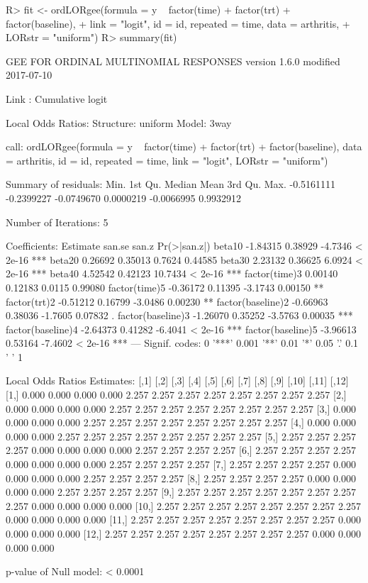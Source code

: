 \documentclass[
]{jss}
\begin{document}
\begin{CodeChunk}
\begin{CodeInput}
R>  fit <- ordLORgee(formula = y ~ factor(time) + factor(trt) + factor(baseline),
+         link = "logit", id = id, repeated = time, data = arthritis,
+         LORstr = "uniform")
R>  summary(fit)
\end{CodeInput}
\begin{CodeOutput}
GEE FOR ORDINAL MULTINOMIAL RESPONSES 
version 1.6.0 modified 2017-07-10 

Link : Cumulative logit 

Local Odds Ratios:
Structure:         uniform
Model:             3way

call:
ordLORgee(formula = y ~ factor(time) + factor(trt) + factor(baseline), 
    data = arthritis, id = id, repeated = time, link = "logit", 
    LORstr = "uniform")

Summary of residuals:
      Min.    1st Qu.     Median       Mean    3rd Qu.       Max. 
-0.5161111 -0.2399227 -0.0749670  0.0000219 -0.0066995  0.9932912 

Number of Iterations: 5 

Coefficients:
                  Estimate   san.se   san.z Pr(>|san.z|)    
beta10            -1.84315  0.38929 -4.7346      < 2e-16 ***
beta20             0.26692  0.35013  0.7624      0.44585    
beta30             2.23132  0.36625  6.0924      < 2e-16 ***
beta40             4.52542  0.42123 10.7434      < 2e-16 ***
factor(time)3      0.00140  0.12183  0.0115      0.99080    
factor(time)5     -0.36172  0.11395 -3.1743      0.00150 ** 
factor(trt)2      -0.51212  0.16799 -3.0486      0.00230 ** 
factor(baseline)2 -0.66963  0.38036 -1.7605      0.07832 .  
factor(baseline)3 -1.26070  0.35252 -3.5763      0.00035 ***
factor(baseline)4 -2.64373  0.41282 -6.4041      < 2e-16 ***
factor(baseline)5 -3.96613  0.53164 -7.4602      < 2e-16 ***
---
Signif. codes:  0 '***' 0.001 '**' 0.01 '*' 0.05 '.' 0.1 ' ' 1

Local Odds Ratios Estimates:
       [,1]  [,2]  [,3]  [,4]  [,5]  [,6]  [,7]  [,8]  [,9] [,10] [,11] [,12]
 [1,] 0.000 0.000 0.000 0.000 2.257 2.257 2.257 2.257 2.257 2.257 2.257 2.257
 [2,] 0.000 0.000 0.000 0.000 2.257 2.257 2.257 2.257 2.257 2.257 2.257 2.257
 [3,] 0.000 0.000 0.000 0.000 2.257 2.257 2.257 2.257 2.257 2.257 2.257 2.257
 [4,] 0.000 0.000 0.000 0.000 2.257 2.257 2.257 2.257 2.257 2.257 2.257 2.257
 [5,] 2.257 2.257 2.257 2.257 0.000 0.000 0.000 0.000 2.257 2.257 2.257 2.257
 [6,] 2.257 2.257 2.257 2.257 0.000 0.000 0.000 0.000 2.257 2.257 2.257 2.257
 [7,] 2.257 2.257 2.257 2.257 0.000 0.000 0.000 0.000 2.257 2.257 2.257 2.257
 [8,] 2.257 2.257 2.257 2.257 0.000 0.000 0.000 0.000 2.257 2.257 2.257 2.257
 [9,] 2.257 2.257 2.257 2.257 2.257 2.257 2.257 2.257 0.000 0.000 0.000 0.000
[10,] 2.257 2.257 2.257 2.257 2.257 2.257 2.257 2.257 0.000 0.000 0.000 0.000
[11,] 2.257 2.257 2.257 2.257 2.257 2.257 2.257 2.257 0.000 0.000 0.000 0.000
[12,] 2.257 2.257 2.257 2.257 2.257 2.257 2.257 2.257 0.000 0.000 0.000 0.000

p-value of Null model: < 0.0001 
\end{CodeOutput}
\end{CodeChunk}
\end{document}
